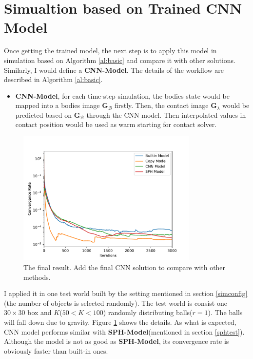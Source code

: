 \section{Simualtion based on Trained CNN Model}
Once getting the trained model, the next step is to apply this model in simulation based on Algorithm \ref{al:basic} and compare it with other solutions. Similarly, I would define a \textbf{CNN-Model}. The details of the workflow are described in Algorithm \ref{al:basic}.
\begin{itemize}
    \item \textbf{CNN-Model}, for each time-step simulation, the bodies state would be mapped into a bodies image $\pmb{G}_{\mathcal{B}}$ firstly. Then, the contact image $\pmb{G}_{\lambda}$ would be predicted based on $\pmb{G}_{\mathcal{B}}$ through the CNN model. Then interpolated values in contact position would be used as warm starting for contact solver.
\end{itemize}
\begin{figure}[!h]
    \centering
    \includegraphics[width=0.8\textwidth]{Figures/cnn.pdf}
    \caption{The final result. Add the final CNN solution to compare with other methods.}
    \label{testoneworld}
\end{figure}

I applied it in one test world built by the setting mentioned in section \ref{simconfig}(the number of objects is selected randomly). The test world is consist one $30 \times 30 $ box and $K$($50<K<100$) randomly distributing balls($r=1$). The balls will fall down due to gravity. Figure \ref{testoneworld} shows the details. As what is expected, CNN model performs similar with \textbf{SPH-Model}(mentioned in section \ref{sphtest}). Although the model is not as good as \textbf{SPH-Model}, its convergence rate is obviously faster than built-in ones. 

